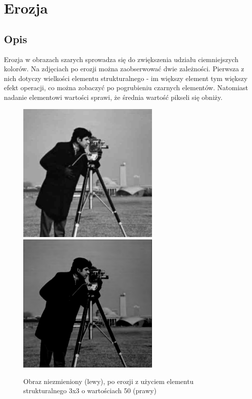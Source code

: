 \documentclass[a4paper,12pt]{book}
\begin{document}
\section{Erozja}
\subsection{Opis}
Erozja w obrazach szarych sprowadza się do zwiększenia udziału ciemniejszych kolorów. Na zdjęciach po erozji można zaobserwować dwie zależności. Pierwsza z nich dotyczy wielkości elementu strukturalnego - im większy element tym większy efekt operacji, co można zobaczyć po pogrubieniu czarnych elementów. Natomiast nadanie elementowi wartości sprawi, że średnia wartość pikseli się obniży. 
\begin{figure}[H]
	\caption{Obraz niezmieniony (lewy), po erozji z użyciem elementu strukturalnego 3x3 o wartościach 50 (prawy)}
	\includegraphics[width=7cm, height=7cm]{man-unmodified.jpg}
	\includegraphics[width=7cm, height=7cm]{morph-gray-erosion-strel3x3-50.png}
\end{figure}
\end{document}
